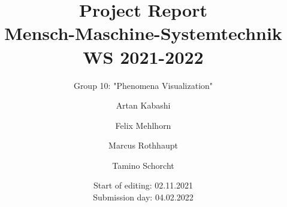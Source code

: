 \documentclass[	
	british,
	cdgeometry=true, %
	headingsvskip=-2.5cm, %
	cdhead=nocolor, %
	cdhead=nodate, %
	cdfont=true,
	ddc=false, %
	parskip=true,
	titlepage=true
]{tudscrartcl}
\begin{document}
\lstset{language=Matlab}


\title{Project Report\\
		Mensch-Maschine-Systemtechnik\\
		WS 2021-2022\vspace{20mm}
		}
		
\newcommand{\Gruppennummer}{10}
\newcommand{\Gruppentitel}{"Phenomena Visualization"}

\subtitle{Group \Gruppennummer : \space\Gruppentitel \vspace{20mm}}

\date{Start of editing: \hspace{15mm} 02.11.2021 \\
		  Submission day: \hspace{13.5mm} 04.02.2022}

\author{Artan Kabashi
    \and
    Felix Mehlhorn
    \and
	Marcus Rothhaupt
	\and
	Tamino Schorcht}

\maketitle


\tableofcontents
\newpage



\newpage



\newpage



\newpage



\newpage



\newpage



\newpage



\newpage



\newpage



\clearpage


\end{document}
